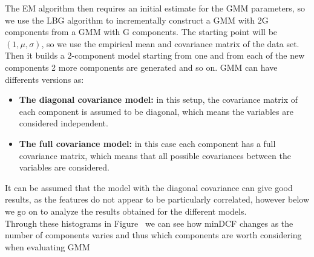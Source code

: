 \documentclass{article}
\begin{document}
The EM algorithm then requires an initial estimate for the GMM parameters, so we use the LBG algorithm to incrementally construct a GMM with 2G components from a GMM with G components. The starting point will be \( (1,\mu,\sigma)\), so we use the empirical mean and covariance matrix of the data set. Then it builds a 2-component model starting from one and from each of the new components 2 more components are generated and so on.
GMM can have differents versions as:
\begin{itemize}
    \item \textbf{The diagonal covariance model:} in this setup, the covariance matrix of each component is assumed to be diagonal, which means the variables are considered independent.
    \item \textbf{The full covariance model:} in this case each component has a full covariance matrix, which means that all possible covariances between the variables are considered.
\end{itemize}
It can be assumed that the model with the diagonal covariance can give good results, as the features do not appear to be particularly correlated, however below we go on to analyze the results obtained for the different models.
\\
Through these histograms in Figure~ we can see how minDCF changes as the number of components varies and thus which components are worth considering when evaluating GMM
\end{document}
